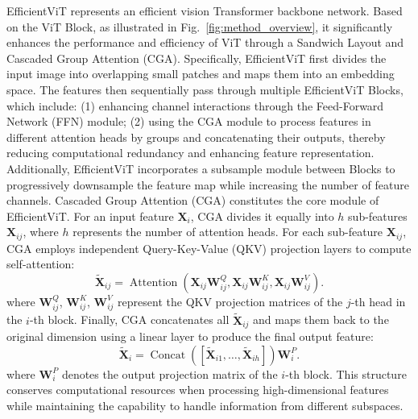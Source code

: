 \documentclass[a4paper,fleqn]{cas-sc}
\begin{document}
EfficientViT \citep{liu2023efficientvit} represents an efficient vision Transformer \citep{dosovitskiy2020image} backbone network. Based on the ViT Block, as illustrated in Fig.~\ref{fig:method_overview}, it significantly enhances the performance and efficiency of ViT through a Sandwich Layout and Cascaded Group Attention (CGA). Specifically, EfficientViT first divides the input image into overlapping small patches and maps them into an embedding space. The features then sequentially pass through multiple EfficientViT Blocks, which include: (1) enhancing channel interactions through the Feed-Forward Network (FFN) module; (2) using the CGA module to process features in different attention heads by groups and concatenating their outputs, thereby reducing computational redundancy and enhancing feature representation. Additionally, EfficientViT incorporates a subsample module between Blocks to progressively downsample the feature map while increasing the number of feature channels. Cascaded Group Attention (CGA) constitutes the core module of EfficientViT. For an input feature $\mathbf{X}_i$, CGA divides it equally into $h$ sub-features $\mathbf{X}_{ij}$, where $h$ represents the number of attention heads. For each sub-feature $\mathbf{X}_{ij}$, CGA employs independent Query-Key-Value (QKV) projection layers to compute self-attention:
\begin{equation}
	\tilde{\mathbf{X}}_{ij} = \operatorname{Attention}(\mathbf{X}_{ij}\mathbf{W}^Q_{ij}, \mathbf{X}_{ij}\mathbf{W}^K_{ij}, \mathbf{X}_{ij}\mathbf{W}^V_{ij}).
\end{equation}
where $\mathbf{W}^Q_{ij}$, $\mathbf{W}^K_{ij}$, $\mathbf{W}^V_{ij}$ represent the QKV projection matrices of the $j$-th head in the $i$-th block. Finally, CGA concatenates all $\tilde{\mathbf{X}}_{ij}$ and maps them back to the original dimension using a linear layer to produce the final output feature:
\begin{equation}
	\tilde{\mathbf{X}}_i = \operatorname{Concat}([\tilde{\mathbf{X}}_{i1}, \ldots, \tilde{\mathbf{X}}_{ih}])\mathbf{W}^P_i.
\end{equation}
where $\mathbf{W}^P_i$ denotes the output projection matrix of the $i$-th block. This structure conserves computational resources when processing high-dimensional features while maintaining the capability to handle information from different subspaces.
\end{document}
